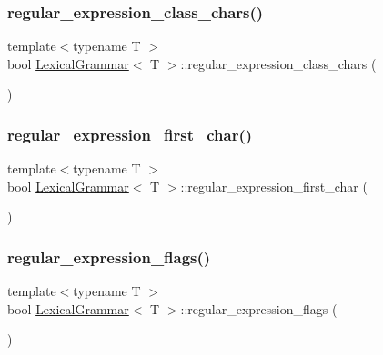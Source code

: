 \subsubsection{\texorpdfstring{regular\+\_\+expression\+\_\+class\+\_\+chars()}{regular\_expression\_class\_chars()}}
{\footnotesize\ttfamily template$<$typename T $>$ \\
bool \hyperlink{class_lexical_grammar}{Lexical\+Grammar}$<$ T $>$\+::regular\+\_\+expression\+\_\+class\+\_\+chars (\begin{DoxyParamCaption}{ }\end{DoxyParamCaption})\hspace{0.3cm}{\ttfamily [inline]}}

\mbox{\label{class_lexical_grammar_afc3a2aeab485760400e58836e00c3d70}} 
\subsubsection{\texorpdfstring{regular\+\_\+expression\+\_\+first\+\_\+char()}{regular\_expression\_first\_char()}}
{\footnotesize\ttfamily template$<$typename T $>$ \\
bool \hyperlink{class_lexical_grammar}{Lexical\+Grammar}$<$ T $>$\+::regular\+\_\+expression\+\_\+first\+\_\+char (\begin{DoxyParamCaption}{ }\end{DoxyParamCaption})\hspace{0.3cm}{\ttfamily [inline]}}

\mbox{\label{class_lexical_grammar_adf9549c929bfd16abf7b7b880c9ee3cf}} 
\subsubsection{\texorpdfstring{regular\+\_\+expression\+\_\+flags()}{regular\_expression\_flags()}}
{\footnotesize\ttfamily template$<$typename T $>$ \\
bool \hyperlink{class_lexical_grammar}{Lexical\+Grammar}$<$ T $>$\+::regular\+\_\+expression\+\_\+flags (\begin{DoxyParamCaption}{ }\end{DoxyParamCaption})\hspace{0.3cm}{\ttfamily [inline]}}

